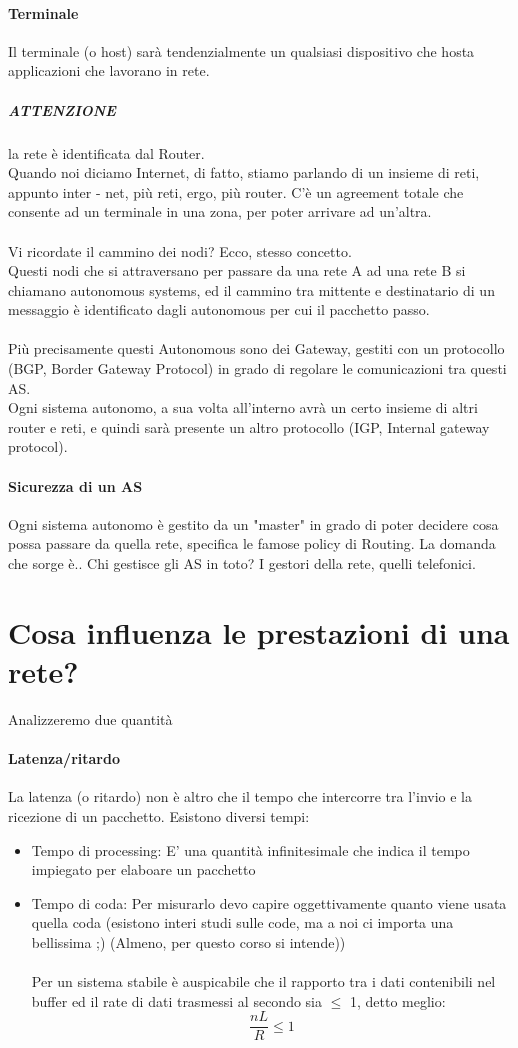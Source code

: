 \documentclass[12pt, a4paper, openany, twoside]{book}
\begin{document}
\paragraph{Terminale}
Il terminale (o host) sarà tendenzialmente un qualsiasi dispositivo che hosta 
applicazioni che lavorano in rete. 
\subparagraph{ATTENZIONE} la rete è identificata dal Router.
\\
Quando noi diciamo Internet, di fatto, stiamo parlando di un insieme di reti,
appunto inter - net, più reti, ergo, più router. C'è un agreement totale che 
consente ad un terminale in una zona, per poter arrivare ad un'altra.
\\ \\
Vi ricordate il cammino dei nodi? Ecco, stesso concetto.
\\
Questi nodi che si attraversano per passare da una rete A ad una rete B si 
chiamano autonomous systems, ed il cammino tra mittente e destinatario di un 
messaggio è identificato dagli autonomous per cui il pacchetto passo.
\\ \\
Più precisamente questi Autonomous sono dei Gateway, gestiti con un protocollo
(BGP, Border Gateway Protocol) in grado di regolare le comunicazioni tra questi AS.
\\ Ogni sistema autonomo, a sua volta all'interno avrà un certo insieme di altri 
router e reti, e quindi sarà presente un altro protocollo (IGP, Internal gateway 
protocol).
\paragraph{Sicurezza di un AS}
Ogni sistema autonomo è gestito da un "master" in grado di poter decidere cosa 
possa passare da quella rete, specifica le famose policy di Routing. La domanda
che sorge è.. Chi gestisce gli AS in toto? I gestori della rete, quelli telefonici.
\section{Cosa influenza le prestazioni di una rete?}
Analizzeremo due quantità
\paragraph{Latenza/ritardo}
La latenza (o ritardo) non è altro che il tempo che intercorre tra l'invio e la 
ricezione di un pacchetto. 
Esistono diversi tempi:
\begin{itemize}
	\item Tempo di processing: E' una quantità infinitesimale che indica il 
	tempo impiegato per elaboare un pacchetto
	\item Tempo di coda: Per misurarlo devo capire oggettivamente quanto viene
	usata quella coda (esistono interi studi sulle code, ma a noi ci importa
	una bellissima  ;) (Almeno, per questo corso si intende)) \\ \\
	Per un sistema stabile è auspicabile che il rapporto tra i dati contenibili
	nel buffer ed il rate di dati trasmessi al secondo sia $\leq$ 1, detto meglio:
	$$ \frac{nL}{R}\leq 1$$ 
\end{itemize}
\end{document}
